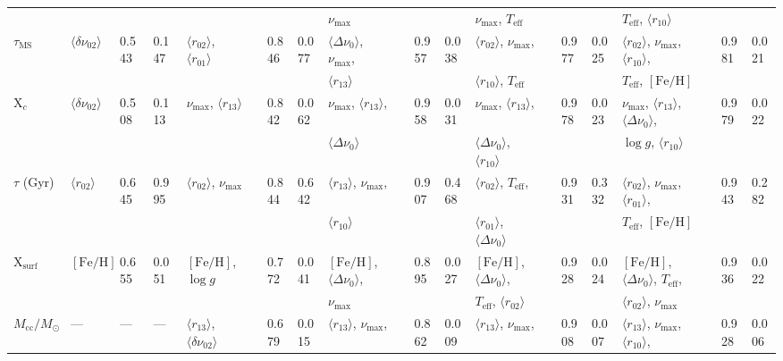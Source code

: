 {\begin{landscape}
\begin{table}
\begin{tabular}{  l | l  l  l | l  l  l  l | l  l  l  l | l  l  l  l | l  l  l  l   }
  &  &  &  &  &  &  &  &  $\nu_{\max}$ &  &  &  & $\nu_{\max}$, $T_{\text{eff}}$ &&  & & $T_{\text{eff}}$, $\langle r_{10}\rangle$ &  &  &\\[3pt] 
    $\tau_{\text{MS}}$ & $\langle\delta\nu_{02}\rangle$ & 0.543 & 0.147 & $\langle r_{02}\rangle$, $\langle r_{01}\rangle$ && 0.846 & 0.077 & $\langle\Delta\nu_0\rangle$, $\nu_{\max}$, && 0.957 & 0.038 & $\langle r_{02}\rangle$, $\nu_{\max}$, && 0.977 & 0.025 & $\langle r_{02}\rangle$, $\nu_{\max}$, $\langle r_{10}\rangle$, && 0.981 & 0.021\\
  &  &  &  &  &  &  &  &  $\langle r_{13}\rangle$ &  &  &  & $\langle r_{10}\rangle$, $T_{\text{eff}}$ &&  & & $T_{\text{eff}}$, $[\text{Fe/H}]$ &  &  &\\[3pt] 
   X$_c$ & $\langle\delta\nu_{02}\rangle$ & 0.508 & 0.113 & $\nu_{\max}$, $\langle r_{13}\rangle$ && 0.842 & 0.062 & $\nu_{\max}$, $\langle r_{13}\rangle$, && 0.958 & 0.031 & $\nu_{\max}$,  $\langle r_{13}\rangle$,& & 0.978 & 0.023 & $\nu_{\max}$, $\langle r_{13}\rangle$, $\langle\Delta\nu_0\rangle$, && 0.979 & 0.022\\
  &  &  &  &  &  &  &  &  $\langle\Delta\nu_0\rangle$ &  &  &  & $\langle\Delta\nu_0\rangle$, $\langle r_{10}\rangle$ &&  & & $\log{} g$, $\langle r_{10}\rangle$ &  &  &\\[3pt]
  $\tau$ (Gyr)& $\langle r_{02}\rangle$ & 0.645 & 0.995 & $\langle r_{02}\rangle$, $\nu_{\max}$ && 0.844 & 0.642 & $\langle r_{13}\rangle$, $\nu_{\max}$, && 0.907 & 0.468 & $\langle r_{02}\rangle$,  $T_{\text{eff}}$, && 0.931 & 0.332 & $\langle r_{02}\rangle$, $\nu_{\max}$, $\langle r_{01}\rangle$, && 0.943 & 0.282\\
  &  &  &  &  &  &  &  &  $\langle r_{10}\rangle$ &  &  &  & $\langle r_{01}\rangle$, $\langle\Delta\nu_0\rangle$ &&  & & $T_{\text{eff}}$, $[\text{Fe/H}]$ &  &  &\\[3pt] 
   X$_{\text{surf}}$ & $[\text{Fe/H}]$ & 0.655 & 0.051 & $[\text{Fe/H}]$, $\log{} g$ && 0.772 & 0.041 & $[\text{Fe/H}]$, $\langle\Delta\nu_0\rangle$, && 0.895 & 0.027 & $[\text{Fe/H}]$, $\langle\Delta\nu_0\rangle$, && 0.928 & 0.024 & $[\text{Fe/H}]$, $\langle\Delta\nu_0\rangle$, $T_{\text{eff}}$, && 0.936 & 0.022\\
  &  &  &  &  &  &  &  &  $\nu_{\max}$ &  &  &  & $T_{\text{eff}}$, $\langle r_{02}\rangle$ &&  & & $\langle r_{02}\rangle$, $\nu_{\max}$ &  &  &\\[3pt] 
  $M_{\text{cc}}/M_\odot$ & --- & --- & --- & $\langle r_{13}\rangle$, $\langle\delta\nu_{02}\rangle$ && 0.679 & 0.015 & $\langle r_{13}\rangle$, $\nu_{\max}$, & &0.862 & 0.009 & $\langle r_{13}\rangle$, $\nu_{\max}$, && 0.908 & 0.007 & $\langle r_{13}\rangle$, $\nu_{\max}$, $\langle r_{10}\rangle$, && 0.928 & 0.006\\

\end{tabular}
\end{table}
\end{landscape}}
